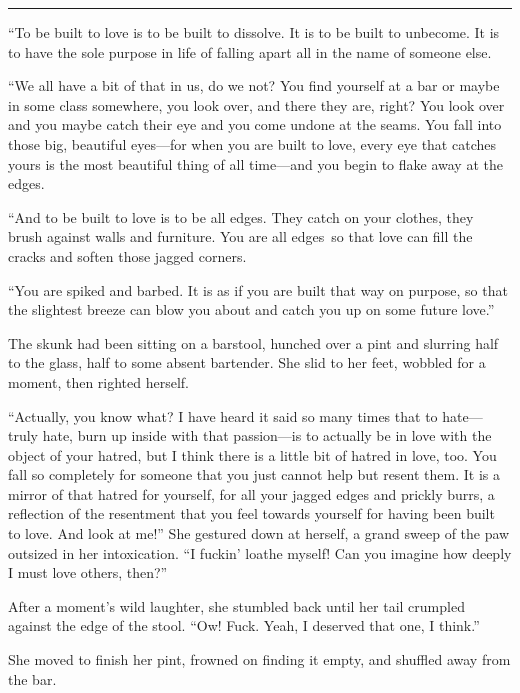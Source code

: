 \vspace{-1em}
\begin{center}\rule{0.5\linewidth}{0.5pt}\end{center}

``To be built to love is to be built to dissolve. It is to be built to unbecome. It is to have the sole purpose in life of falling apart all in the name of someone else.

``We all have a bit of that in us, do we not? You find yourself at a bar or maybe in some class somewhere, you look over, and there they are, right? You look over and you maybe catch their eye and you come undone at the seams. You fall into those big, beautiful eyes—for when you are built to love, every eye that catches yours is the most beautiful thing of all time—and you begin to flake away at the edges.

``And to be built to love is to be all edges. They catch on your clothes, they brush against walls and furniture. You are all edges\pagebreak\ so that love can fill the cracks and soften those jagged corners.

``You are spiked and barbed. It is as if you are built that way on purpose, so that the slightest breeze can blow you about and catch you up on some future love.''

The skunk had been sitting on a barstool, hunched over a pint and slurring half to the glass, half to some absent bartender. She slid to her feet, wobbled for a moment, then righted herself.

``Actually, you know what? I have heard it said so many times that to hate—truly hate, burn up inside with that passion—is to actually be in love with the object of your hatred, but I think there is a little bit of hatred in love, too. You fall so completely for someone that you just cannot help but resent them. It is a mirror of that hatred for yourself, for all your jagged edges and prickly burrs, a reflection of the resentment that you feel towards yourself for having been built to love. And look at me!'' She gestured down at herself, a grand sweep of the paw outsized in her intoxication. ``I fuckin' loathe myself! Can you imagine how deeply I must love others, then?''

After a moment's wild laughter, she stumbled back until her tail crumpled against the edge of the stool. ``Ow! Fuck. Yeah, I deserved that one, I think.''

She moved to finish her pint, frowned on finding it empty, and shuffled away from the bar.

